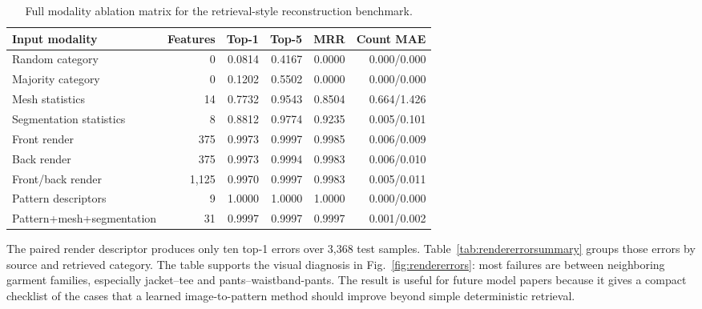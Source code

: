 \documentclass[pdflatex,sn-mathphys-num]{sn-jnl}
\begin{document}
\begin{table}[!htbp]
\caption{Full modality ablation matrix for the retrieval-style reconstruction benchmark.}
\label{tab:ablationmatrix}
\centering
\begin{tabular}{lrrrrr}
\toprule
Input modality & Features & Top-1 & Top-5 & MRR & Count MAE \\
\midrule
Random category & 0 & 0.0814 & 0.4167 & 0.0000 & 0.000/0.000 \\
Majority category & 0 & 0.1202 & 0.5502 & 0.0000 & 0.000/0.000 \\
Mesh statistics & 14 & 0.7732 & 0.9543 & 0.8504 & 0.664/1.426 \\
Segmentation statistics & 8 & 0.8812 & 0.9774 & 0.9235 & 0.005/0.101 \\
Front render & 375 & 0.9973 & 0.9997 & 0.9985 & 0.006/0.009 \\
Back render & 375 & 0.9973 & 0.9994 & 0.9983 & 0.006/0.010 \\
Front/back render & 1,125 & 0.9970 & 0.9997 & 0.9983 & 0.005/0.011 \\
Pattern descriptors & 9 & 1.0000 & 1.0000 & 1.0000 & 0.000/0.000 \\
Pattern+mesh+segmentation & 31 & 0.9997 & 0.9997 & 0.9997 & 0.001/0.002 \\
\bottomrule
\end{tabular}
\end{table}

The paired render descriptor produces only ten top-1 errors over 3,368 test samples. Table~\ref{tab:rendererrorsummary} groups those errors by source and retrieved category. The table supports the visual diagnosis in Fig.~\ref{fig:rendererrors}: most failures are between neighboring garment families, especially jacket--tee and pants--waistband-pants. The result is useful for future model papers because it gives a compact checklist of the cases that a learned image-to-pattern method should improve beyond simple deterministic retrieval.
\end{document}
